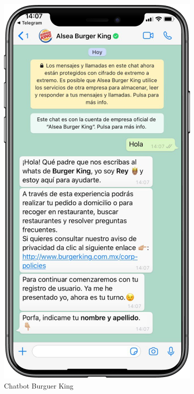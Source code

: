 \begin{figure}[h]
    \centering
    \includegraphics[scale=0.4]{include/figuras/BurguerKing.png}
    \caption{Chatbot Burguer King}
    \label{fig:burguer}
\end{figure}
